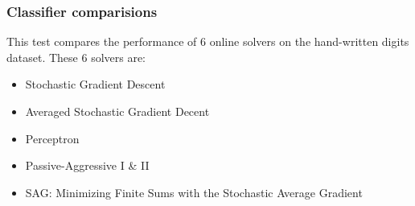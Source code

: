 \documentclass[11pt]{article}
\begin{document}





\subsubsection{Classifier comparisions}

This test compares the performance of 6 online solvers on the hand-written digits dataset.
These 6 solvers are:
\begin{itemize}
    \item Stochastic Gradient Descent 
    \item Averaged Stochastic Gradient Decent
    \item Perceptron
    \item Passive-Aggressive I \& II
    \item SAG: Minimizing Finite Sums with the Stochastic Average Gradient
\end{itemize}
\end{document}
